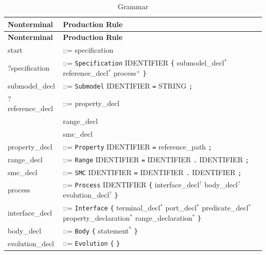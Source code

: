 \begingroup
\renewcommand{\arraystretch}{0.92}
\setlength{\tabcolsep}{4pt}
\begin{longtable}{
>{\ttfamily\small}p{}
>{\raggedright\arraybackslash\small}p{}
}
\caption{Grammar}
\label{tab:grammar}\\
\toprule
\textbf{Nonterminal} & \textbf{Production Rule}\\
\midrule
\endfirsthead
\toprule
\textbf{Nonterminal} & \textbf{Production Rule}\\
\midrule
\endhead
\bottomrule
\endfoot
start & ::= specification\\

?specification & ::= \texttt{Specification} IDENTIFIER \texttt{\{} submodel_decl$^{*}$ reference_decl$^{*}$ process$^{+}$ \texttt{\}}\\

submodel\_decl & ::= \texttt{Submodel} IDENTIFIER \texttt{=} STRING \texttt{;}\\

?reference\_decl & ::= property_decl\\
& \textbar{} range_decl\\
& \textbar{} smc_decl\\

property\_decl & ::= \texttt{Property} IDENTIFIER \texttt{=} reference_path \texttt{;}\\

range\_decl & ::= \texttt{Range} IDENTIFIER \texttt{=} IDENTIFIER \texttt{.} IDENTIFIER \texttt{;}\\

smc\_decl & ::= \texttt{SMC} IDENTIFIER \texttt{=} IDENTIFIER \texttt{.} IDENTIFIER \texttt{;}\\

process & ::= \texttt{Process}  IDENTIFIER \texttt{\{} interface_decl$^{?}$  body_decl$^{?}$ evolution_decl$^{?}$ \texttt{\}}\\

interface\_decl & ::= \texttt{Interface} \texttt{\{} terminal_decl$^{*}$ port_decl$^{*}$ predicate_decl$^{*}$ property_declaration$^{*}$ range_declaration$^{*}$ \texttt{\}}\\

body\_decl & ::= \texttt{Body} \texttt{\{} statement$^{*}$ \texttt{\}}\\

evolution\_decl & ::= \texttt{Evolution} \texttt{\{}  \texttt{\}}\\


\end{longtable}
